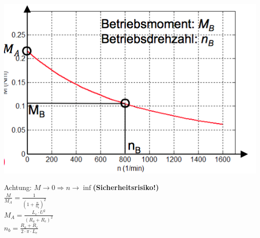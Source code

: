 \begin{minipage}{0.3 \linewidth}
\includegraphics[width = \linewidth]{./Pics/VL45/Reihenschluss2}
\end{minipage}
\begin{minipage}{0.7 \linewidth}
\large{Achtung:} $M \rightarrow 0 \Rightarrow n \rightarrow \inf $\textbf{(Sicherheitsrisiko!)} \\

$\frac{M}{M_A} = \frac{1}{(1 + \frac{n}{n_b})^2} $  \\

$M_A = \frac{L_e \cdot U^2}{(R_a + R_e)^2} $ \\

$n_b = \frac{R_a + R_e}{2 \cdot \pi \cdot L_e}$
\end{minipage}

